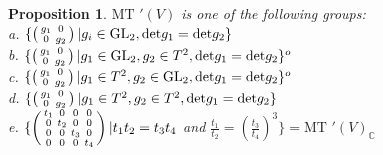 \documentclass[12pt,titlepage]{article}
\newtheorem{prop}[lem]{Proposition}
\begin{document}
\begin{prop}
  $\text{MT }'(V)$ is one of the following groups:\\
    \indent a. $\{ \left( \begin{smallmatrix} g_1&0\\0&g_2 \end{smallmatrix} \right) \arrowvert g_{i} \in \text{GL}_2,
               \text{det}g_1 = \text{det}g_2 \}$\\
  \indent b. $\{ \left( \begin{smallmatrix} g_1&0\\0&g_2 \end{smallmatrix} \right) \arrowvert g_{1} \in \text{GL}_2,
               g_2 \in T^2, \text{det}g_1 = \text{det}g_2 \}^{o}$\\
  \indent c. $\{ \left( \begin{smallmatrix} g_1&0\\0&g_2 \end{smallmatrix} \right) \arrowvert g_{1} \in T^2,
               g_2 \in \text{GL}_2, \text{det}g_1 = \text{det}g_2 \}^{o}$\\
  \indent d. $\{ \left( \begin{smallmatrix} g_1&0\\0&g_2 \end{smallmatrix} \right) \arrowvert g_{1} \in T^2,
               g_2 \in T^2, \text{det}g_1 = \text{det}g_2 \}$\\
  \indent e. $\{ \left( \begin{smallmatrix} t_1&0&0&0\\0&t_2&0&0\\0&0&t_3&0\\0&0&0&t_4 \end{smallmatrix} \right)
                  \arrowvert t_1t_2=t_3t_4 $ and $ \frac{t_1}{t_2} = (\frac{t_3}{t_4})^3 \} = \text{MT }'(V)_\mathbb{C}$

\end{prop}
\end{document}
